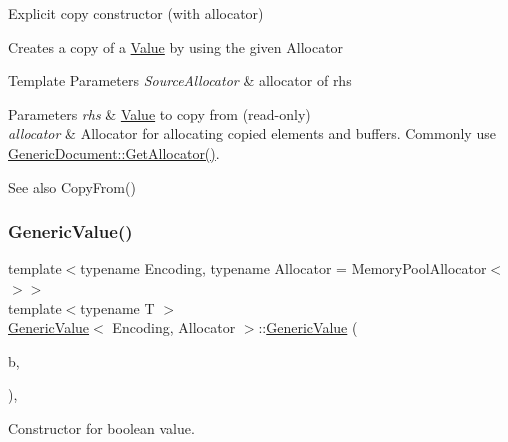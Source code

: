 Explicit copy constructor (with allocator) 

Creates a copy of a \hyperlink{classValue}{Value} by using the given Allocator 
\begin{DoxyTemplParams}{Template Parameters}
{\em Source\+Allocator} & allocator of {\ttfamily rhs} \\
\hline
\end{DoxyTemplParams}

\begin{DoxyParams}{Parameters}
{\em rhs} & \hyperlink{classValue}{Value} to copy from (read-\/only) \\
\hline
{\em allocator} & Allocator for allocating copied elements and buffers. Commonly use \hyperlink{classGenericDocument_aa4609d6b19f86aec1a6b96edf2c27686}{Generic\+Document\+::\+Get\+Allocator()}. \\
\hline
\end{DoxyParams}
\begin{DoxySeeAlso}{See also}
Copy\+From() 
\end{DoxySeeAlso}
\mbox{\label{classGenericValue_a0f6a0394bfffaedde88e433b2265194c}} 
\subsubsection{\texorpdfstring{Generic\+Value()}{GenericValue()}\hspace{0.1cm}{\footnotesize\ttfamily [6/8]}}
{\footnotesize\ttfamily template$<$typename Encoding, typename Allocator = Memory\+Pool\+Allocator$<$$>$$>$ \\
template$<$typename T $>$ \\
\hyperlink{classGenericValue}{Generic\+Value}$<$ Encoding, Allocator $>$\+::\hyperlink{classGenericValue}{Generic\+Value} (\begin{DoxyParamCaption}\item[{T}]{b,  }\item[{R\+A\+P\+I\+D\+J\+S\+O\+N\+\_\+\+E\+N\+A\+B\+L\+E\+IF((internal\+::\+Is\+Same$<$ bool, T $>$))}]{ }\end{DoxyParamCaption})\hspace{0.3cm}{\ttfamily [inline]}, {\ttfamily [explicit]}}



Constructor for boolean value. 


